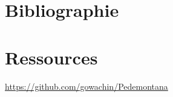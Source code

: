 \documentclass[12pt,a4paper,notitlepage]{article}
\begin{document}
\section{Bibliographie}



\section{Ressources}
\url{https://github.com/gowachin/Pedemontana}\label{app:github}


\end{document}
